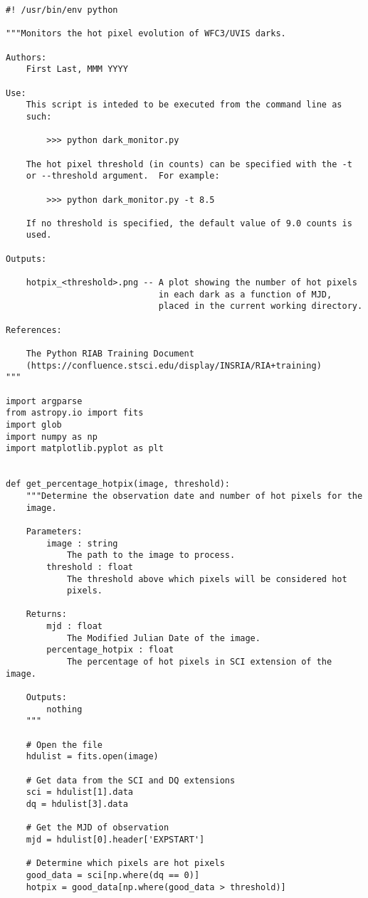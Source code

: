 \begin{verbatim}
#! /usr/bin/env python

"""Monitors the hot pixel evolution of WFC3/UVIS darks.

Authors:
    First Last, MMM YYYY

Use:
    This script is inteded to be executed from the command line as
    such:

        >>> python dark_monitor.py

    The hot pixel threshold (in counts) can be specified with the -t 
    or --threshold argument.  For example:

        >>> python dark_monitor.py -t 8.5

    If no threshold is specified, the default value of 9.0 counts is 
    used.

Outputs:

    hotpix_<threshold>.png -- A plot showing the number of hot pixels 
                              in each dark as a function of MJD, 
                              placed in the current working directory.

References:

    The Python RIAB Training Document
    (https://confluence.stsci.edu/display/INSRIA/RIA+training)
"""

import argparse
from astropy.io import fits
import glob
import numpy as np
import matplotlib.pyplot as plt


def get_percentage_hotpix(image, threshold):
    """Determine the observation date and number of hot pixels for the
    image.

    Parameters:
        image : string
            The path to the image to process.
        threshold : float
            The threshold above which pixels will be considered hot
            pixels.

    Returns:
        mjd : float
            The Modified Julian Date of the image.
        percentage_hotpix : float
            The percentage of hot pixels in SCI extension of the image.

    Outputs:
        nothing
    """

    # Open the file
    hdulist = fits.open(image)

    # Get data from the SCI and DQ extensions
    sci = hdulist[1].data
    dq = hdulist[3].data

    # Get the MJD of observation
    mjd = hdulist[0].header['EXPSTART']

    # Determine which pixels are hot pixels
    good_data = sci[np.where(dq == 0)]
    hotpix = good_data[np.where(good_data > threshold)]


\end{verbatim}
